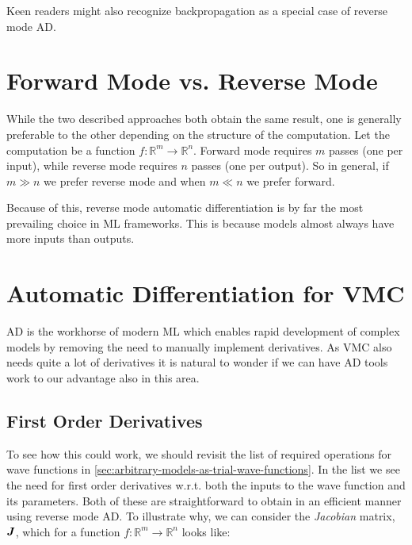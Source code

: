 \documentclass[Thesis.tex]{subfiles}
\begin{document}
Keen readers might also recognize backpropagation as a special case of reverse mode AD.

\section{Forward Mode vs. Reverse Mode}

While the two described approaches both obtain the same result, one is generally
preferable to the other depending on the structure of the computation. Let the
computation be a function $f: \mathbb{R}^{m}\to\mathbb{R}^n$. Forward mode
requires $m$ passes (one per input), while reverse mode requires $n$ passes (one
per output). So in general, if $m \gg n$ we prefer reverse mode and when $m\ll
n$ we prefer forward. 

Because of this, reverse mode automatic differentiation is by far the most
prevailing choice in ML frameworks. This is because models almost always have
more inputs than outputs. 

\section{Automatic Differentiation for VMC}

AD is the workhorse of modern ML which enables rapid development of complex
models by removing the need to manually implement derivatives. As VMC also needs
quite a lot of derivatives it is natural to wonder if we can have AD tools work
to our advantage also in this area.

\subsection{First Order Derivatives}

To see how this could work, we should revisit the list of required operations
for wave functions in \cref{sec:arbitrary-models-as-trial-wave-functions}. In
the list we see the need for first order derivatives w.r.t. both the inputs to
the wave function and its parameters. Both of these are straightforward to
obtain in an efficient manner using reverse mode AD. To illustrate why, we can
consider the \emph{Jacobian} matrix, $\bm{J}$, which for a function
$f:\mathbb{R}^m\to\mathbb{R}^n$ looks like:
\end{document}
